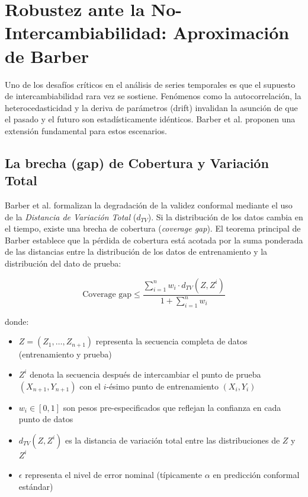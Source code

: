 \section{Robustez ante la No-Intercambiabilidad: Aproximación de Barber}
\label{sec:barber_robustness_detail}

Uno de los desafíos críticos en el análisis de series temporales es que el supuesto de intercambiabilidad rara vez se sostiene. Fenómenos como la autocorrelación, la heterocedasticidad y la deriva de parámetros (drift) invalidan la asunción de que el pasado y el futuro son estadísticamente idénticos. Barber et al. proponen una extensión fundamental para estos escenarios.

\subsection{La brecha (gap) de Cobertura y Variación Total}


Barber et al. formalizan la degradación de la validez conformal mediante el uso de la \textit{Distancia de Variación Total} ($d_{TV}$). Si la distribución de los datos cambia en el tiempo, existe una brecha de cobertura (\textit{coverage gap}). El teorema principal de Barber establece que la pérdida de cobertura está acotada por la suma ponderada de las distancias entre la distribución de los datos de entrenamiento y la distribución del dato de prueba:

\begin{equation}
    \text{Coverage gap} \leq \frac{\sum_{i=1}^{n} w_i \cdot d_{TV}(Z, Z^i)}{1 + \sum_{i=1}^{n} w_i}
\end{equation}

donde:
\begin{itemize}
    \item $Z = (Z_1, \ldots, Z_{n+1})$ representa la secuencia completa de datos (entrenamiento y prueba)
    \item $Z^i$ denota la secuencia después de intercambiar el punto de prueba $(X_{n+1}, Y_{n+1})$ con el $i$-ésimo punto de entrenamiento $(X_i, Y_i)$
    \item $w_i \in [0,1]$ son pesos pre-especificados que reflejan la confianza en cada punto de datos
    \item $d_{TV}(Z, Z^i)$ es la distancia de variación total entre las distribuciones de $Z$ y $Z^i$
    \item $\epsilon$ representa el nivel de error nominal (típicamente $\alpha$ en predicción conformal estándar)
\end{itemize}


